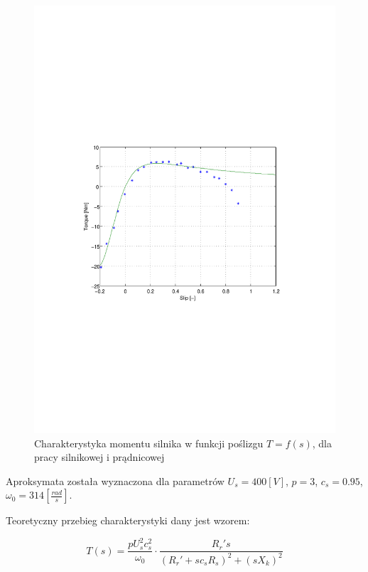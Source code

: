\documentclass[12pt]{article}
\begin{document}
\begin{figure}[!htb]
	\begin{center}
		\includegraphics[trim=5cm 9cm 5cm 9cm]{../res/img/T_f(s)3.pdf}  
	\end{center}
	\caption{Charakterystyka momentu silnika w funkcji poślizgu $T=f(s)$, dla pracy
	silnikowej i prądnicowej}
\end{figure}

Aproksymata została wyznaczona dla parametrów $U_s=400[V]$, $p=3$, $c_s=0.95$,
$\omega_0=314[\frac{rad}{s}]$.

Teoretyczny przebieg charakterystyki dany jest wzorem:

\begin{equation*}
	T(s) = \frac{pU_s^2c_s^2}{\omega_0}\cdot
	\frac{R_r's}{(R_r'+sc_sR_s)^2+(sX_k)^2}
\end{equation*}
 
\end{document}

